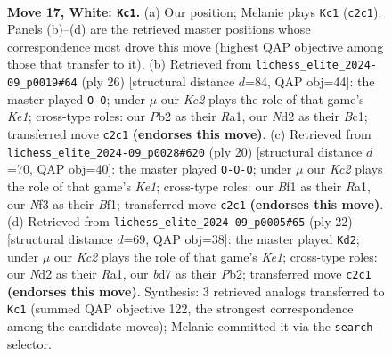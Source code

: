 \documentclass[11pt]{article}
\begin{document}
\clearpage

\begin{figure}[p]\centering
\begin{subfigure}{0.46\textwidth}\centering
\resizebox{\linewidth}{!}{%
\newchessgame
\chessboard[
  setfen={1r3b1r/1p1b1kpp/p1n1p3/4Pp2/n7/4BNP1/PPKN1P1P/R4BR1 w - - 2 17},
  showmover=false,
  pgfstyle=straightmove, color=movearrow, markmove={c2-c1}
]}
\caption{}
\end{subfigure}\hfill
\begin{subfigure}{0.46\textwidth}\centering
\resizebox{\linewidth}{!}{%
\newchessgame
\chessboard[
  setfen={r1b1kb1r/ppp2ppp/1n3n2/3P4/5P2/1NNB4/PPP3PP/R1B1K2R w KQkq - 1 14},
  showmover=false,
  pgfstyle=straightmove, color=movearrow, markmove={e1-g1}
]}
\caption{}
\end{subfigure}
\\[4pt]
\begin{subfigure}{0.46\textwidth}\centering
\resizebox{\linewidth}{!}{%
\newchessgame
\chessboard[
  setfen={r4b1r/ppk2ppp/2p1bn2/4p3/2P1P3/4BP2/PP1N2PP/R3KB1R w KQ - 5 11},
  showmover=false,
  pgfstyle=straightmove, color=movearrow, markmove={e1-c1}
]}
\caption{}
\end{subfigure}\hfill
\begin{subfigure}{0.46\textwidth}\centering
\resizebox{\linewidth}{!}{%
\newchessgame
\chessboard[
  setfen={r4bnr/pp1k1ppp/4p1b1/3pP3/1n1P2P1/2N1B3/PP2NP1P/R3KB1R w KQ - 0 12},
  showmover=false,
  pgfstyle=straightmove, color=movearrow, markmove={e1-d2}
]}
\caption{}
\end{subfigure}
\caption{\textbf{Move 17, White: \texttt{Kc1}.} (a) Our position; Melanie plays \texttt{Kc1} (\texttt{c2c1}). Panels (b)--(d) are the retrieved master positions whose correspondence most drove this move (highest QAP objective among those that transfer to it). (b) Retrieved from \texttt{lichess\_elite\_2024-09\_p0019\#64} (ply 26) [structural distance $d$=84, QAP obj=44]: the master played \texttt{O-O}; under $\mu$ our \emph{Kc2} plays the role of that game's \emph{Ke1}; cross-type roles: our \emph{P}b2 as their \emph{R}a1, our \emph{N}d2 as their \emph{B}c1; transferred move \texttt{c2c1} \textbf{(endorses this move)}. (c) Retrieved from \texttt{lichess\_elite\_2024-09\_p0028\#620} (ply 20) [structural distance $d$=70, QAP obj=40]: the master played \texttt{O-O-O}; under $\mu$ our \emph{Kc2} plays the role of that game's \emph{Ke1}; cross-type roles: our \emph{B}f1 as their \emph{R}a1, our \emph{N}f3 as their \emph{B}f1; transferred move \texttt{c2c1} \textbf{(endorses this move)}. (d) Retrieved from \texttt{lichess\_elite\_2024-09\_p0005\#65} (ply 22) [structural distance $d$=69, QAP obj=38]: the master played \texttt{Kd2}; under $\mu$ our \emph{Kc2} plays the role of that game's \emph{Ke1}; cross-type roles: our \emph{N}d2 as their \emph{R}a1, our \emph{b}d7 as their \emph{P}b2; transferred move \texttt{c2c1} \textbf{(endorses this move)}. Synthesis: 3 retrieved analogs transferred to \texttt{Kc1} (summed QAP objective 122, the strongest correspondence among the candidate moves); Melanie committed it via the \texttt{search} selector.}
\label{fig:thought-m32}
\end{figure}
\end{document}
